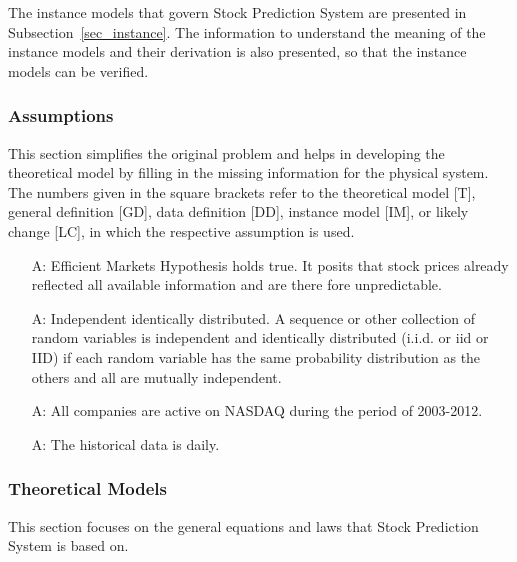 \documentclass[12pt]{article}
\newcounter{assumpnum} %
\newcommand{\progname}{Stock Prediction System} %
\begin{document}
The instance models that govern \progname{} are presented in
Subsection~\ref{sec_instance}.  The information to understand the meaning of the
instance models and their derivation is also presented, so that the instance
models can be verified.

\subsubsection{Assumptions}

This section simplifies the original problem and helps in developing the
theoretical model by filling in the missing information for the physical
system. The numbers given in the square brackets refer to the theoretical model
[T], general definition [GD], data definition [DD], instance model [IM], or
likely change [LC], in which the respective assumption is used.

\begin{itemize}

\item[A\refstepcounter{assumpnum}\theassumpnum \label{Ass1}:]
Efficient Markets Hypothesis holds true. It posits that stock prices already reflected all available information and are there fore unpredictable. 

\item[A\refstepcounter{assumpnum}\theassumpnum \label{Ass2}:]
Independent identically distributed. A sequence or other collection of random variables is independent and identically distributed (i.i.d. or iid or IID) if each random variable has the same probability distribution as the others and all are mutually independent.

\item[A\refstepcounter{assumpnum}\theassumpnum \label{Ass3}:]
All companies are active on NASDAQ during the period of 2003-2012.  

\item[A\refstepcounter{assumpnum}\theassumpnum \label{Ass4}:]
The historical data is daily.

\end{itemize}

\subsubsection{Theoretical Models}\label{sec_theoretical}

This section focuses on the general equations and laws that \progname{} is based
on. 
\end{document}
